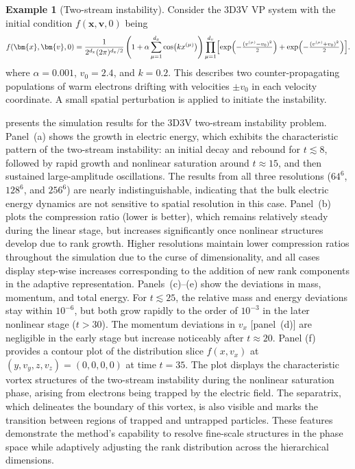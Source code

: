 \documentclass{article}
\theoremstyle{plain}
\theoremstyle{definition}
\newtheorem{example}[theorem]{Example}
\theoremstyle{remark}
\begin{document}
\begin{example}[Two-stream instability]
Consider the 3D3V VP system with the initial condition $f(\bm{x},\bm{v},0)$ being
\[
    f(\bm{x},\bm{v},0) = \frac{1}{2^{d_x}(2\pi)^{d_x/2}}
    \left(1 + \alpha \sum_{\mu=1}^{d_x} \cos\!\big(k x^{(\mu)}\big)\right) 
    \prod_{\mu=1}^{d_v}
    \Bigl[
        \exp\!\left(-\tfrac{(v^{(\mu)}-v_0)^2}{2}\right)
        + \exp\!\left(-\tfrac{(v^{(\mu)}+v_0)^2}{2}\right)
    \Bigr].
\]
where $\alpha = 0.001$, $v_0 = 2.4$, and $k = 0.2$.  
This describes two counter-propagating populations of warm electrons drifting with velocities $\pm v_0$ in each velocity coordinate. A small spatial perturbation is applied to initiate the instability.  

 presents the simulation results for the 3D3V two-stream instability problem. Panel~(a) shows the growth in electric energy, which exhibits the characteristic pattern of the two-stream instability: an initial decay and rebound for $t \lesssim 8$, followed by rapid growth and nonlinear saturation around $t \approx 15$, and then sustained large-amplitude oscillations. The results from all three resolutions ($64^6$, $128^6$, and $256^6$) are nearly indistinguishable, indicating that the bulk electric energy dynamics are not sensitive to spatial resolution in this case. 
Panel~(b) plots the compression ratio (lower is better), which remains relatively steady during the linear stage, but increases significantly once nonlinear structures develop due to rank growth. Higher resolutions maintain lower compression ratios throughout the simulation due to the curse of dimensionality, and all cases display step-wise increases corresponding to the addition of new rank components in the adaptive representation. 
Panels~(c)–(e) show the deviations in mass, momentum, and total energy. For $t \lesssim 25$, the relative mass and energy deviations stay within $10^{-6}$, but both grow rapidly to the order of $10^{-3}$ in the later nonlinear stage ($t > 30$). The momentum deviations in $v_x$ [panel~(d)] are negligible in the early stage but increase noticeably after $t \approx 20$.
Panel (f) provides a contour plot of the distribution slice $f(x,v_x)$ at $(y,v_y,z,v_z) = (0,0,0,0)$ at time $t = 35$. The plot displays the characteristic vortex structures of the two-stream instability during the nonlinear saturation phase, arising from electrons being trapped by the electric field. The separatrix, which delineates the boundary of this vortex, is also visible and marks the transition between regions of trapped and untrapped particles. These features demonstrate the method's capability to resolve fine-scale structures in the phase space while adaptively adjusting the rank distribution across the hierarchical dimensions.


\end{example}
\end{document}
